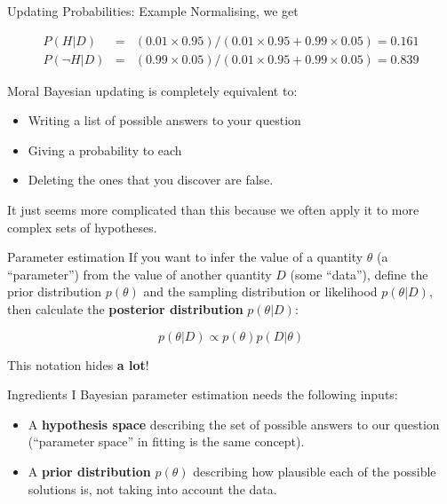\documentclass{beamer}
\begin{document}
\begin{frame}[t]{Updating Probabilities: Example}
Normalising, we get

\begin{eqnarray*}
P(H | D) &=& (0.01 \times 0.95)/(0.01 \times 0.95 + 0.99\times0.05) = 0.161\\
P(\neg H | D) &=& (0.99 \times 0.05)/(0.01 \times 0.95 + 0.99\times0.05) = 0.839
\end{eqnarray*}
\end{frame}

\begin{frame}[t]{Moral}
Bayesian updating is completely equivalent to:
\begin{itemize}
\item Writing a list of possible answers to your question
\item Giving a probability to each
\item Deleting the ones that you discover are false.
\end{itemize}

It just seems more complicated than this because we often apply it to more
complex sets of hypotheses.
\end{frame}

\begin{frame}[t]{Parameter estimation}
If you want to infer the value of a quantity $\theta$
(a ``parameter'') from the value of
another quantity $D$ (some ``data''),
define the prior distribution $p(\theta)$
and the sampling distribution or likelihood $p(\theta | D)$,
then calculate the {\bf posterior distribution}
$p(\theta | D)$:

\begin{equation}
p(\theta | D) \propto p(\theta)p(D|\theta)
\end{equation}

This notation hides {\bf a lot}!
\end{frame}


\begin{frame}[t]{Ingredients I}
Bayesian parameter estimation needs the following inputs:

\begin{itemize}
\setlength{\itemsep}{20pt}
\item A {\bf hypothesis space} describing the set of possible answers to our
question (``parameter space'' in fitting is the same concept).
\item A {\bf prior distribution} $p(\theta)$ describing how plausible
each of the possible solutions is, not taking into account the data.
\end{itemize}
\end{frame}
\end{document}
